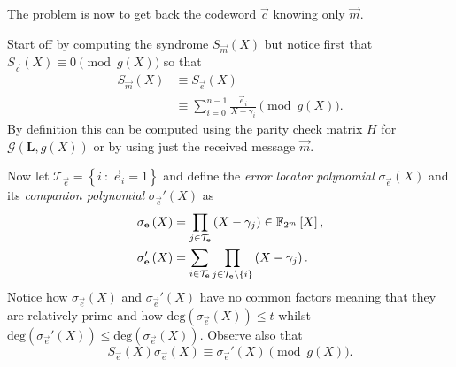 The problem is now to get back the codeword $\vec{c}$ knowing only $\vec{m}$.

Start off by computing the syndrome $S_{\vec{m}}\left(X\right)$ but notice first that\\
$S_{\vec{c}}\left(X\right) \equiv 0 \pmod {g\left(X\right)}$ so that
\begin{align*}
S_{\vec{m}}\left(X\right) &\equiv S_{\vec{e}}\left(X\right)\\
	&\equiv \sum\limits_{i=0}^{n-1} \frac{\vec{e}_i}{X - \gamma_i} \pmod {g\left(X\right)}.
\end{align*}
By definition this can be computed using the parity check matrix $H$ for $\mathcal{G}\left(\mathbf{L},g\left(X\right)\right)$ or by using just the received message $\vec{m}$.

Now let $\mathcal{T}_{\vec{e}} = \left\{ i \ : \ \vec{e}_i = 1 \right\}$ and define the \emph{error locator polynomial} $\sigma_{\vec{e}}\left(X\right)$ and its \emph{companion polynomial} $\sigma_{\vec{e}}'\left(X\right)$ as
\begin{align*}
	\sigma_{\boldsymbol{\mathrm{e}}}\left(X\right) &= \prod\limits_{j \in \mathcal{T}_{\boldsymbol{\mathrm{e}}}} \left(X - \gamma_j\right) \in \mathbb{F}_{2^m}\left[X\right],\\
	\sigma_{\boldsymbol{\mathrm{e}}}'\left(X\right) &= \sum\limits_{i \in \mathcal{T}_{\boldsymbol{\mathrm{e}}}} \prod\limits_{j \in \mathcal{T}_{\boldsymbol{\mathrm{e}}} \setminus \left\{ i \right\} } \left(X - \gamma_j\right).
\end{align*}
Notice how $\sigma_{\vec{e}}\left(X\right)$ and $\sigma_{\vec{e}}'\left(X\right)$ have no common factors meaning that they are relatively prime and how $\mathrm{deg}\left(\sigma_{\vec{e}}\left(X\right)\right) \leq t$ whilst $\mathrm{deg}\left(\sigma_{\vec{e}}'\left(X\right)\right) \leq \mathrm{deg}\left(\sigma_{\vec{e}}\left(X\right)\right)$. Observe also that
\begin{equation}
\label{eq:6FromEOS}
S_{\vec{e}}\left(X\right) \sigma_{\vec{e}}\left(X\right) \equiv \sigma_{\vec{e}}'\left(X\right) \pmod {g\left(X\right)}.
\end{equation}

